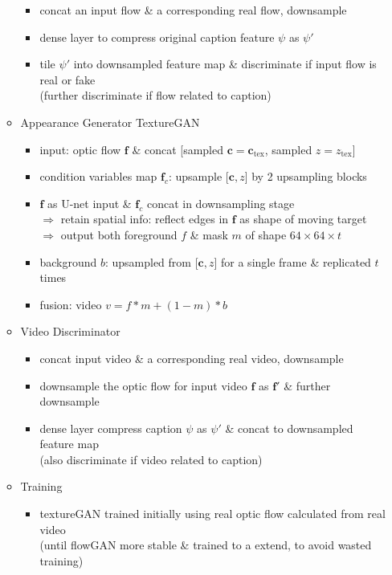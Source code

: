 \begin{itemize}
\begin{itemize}
\begin{itemize}
		\item concat an input flow \& a corresponding real flow, downsample
		\item dense layer to compress original caption feature $\psi$ as $\psi'$
		\item tile $\psi'$ into downsampled feature map \& discriminate if input flow is real or fake \\
		(further discriminate if flow related to caption)
		\end{itemize}
	\item Appearance Generator TextureGAN
		\begin{itemize}
		\item input: optic flow $\mathbf f$ \& concat [sampled $\mathbf c=\mathbf c_\text{tex}$, sampled $z=z_\text{tex}$]
		\item condition variables map $\mathbf f_c$: upsample [$\mathbf c, z$] by 2 upsampling blocks
		\item $\mathbf f$ as U-net input \& $\mathbf f_c$ concat in downsampling stage \\
		$\Rightarrow$ retain spatial info: reflect edges in $\mathbf f$ as shape of moving target \\
		$\Rightarrow$ output both foreground $f$ \& mask $m$ of shape $64\times64\times t$
		\item background $b$: upsampled from [$\mathbf c, z$] for a single frame \& replicated $t$ times
		\item fusion: video $v = f*m + (1-m)*b$
		\end{itemize}
	\item Video Discriminator
		\begin{itemize}
		\item concat input video \& a corresponding real video, downsample
		\item downsample the optic flow for input video $\mathbf f$ as $\mathbf f'$ \& further downsample
		\item dense layer compress caption $\psi$ as $\psi'$ \& concat to downsampled feature map \\
		(also discriminate if video related to caption)
		\end{itemize}
	\item Training
		\begin{itemize}
		\item textureGAN trained initially using real optic flow calculated from real video \\
		(until flowGAN more stable \& trained to a extend, to avoid wasted training)

\end{itemize}
\end{itemize}
\end{itemize}
